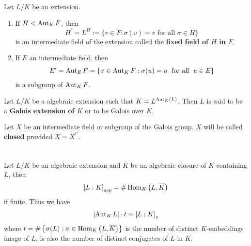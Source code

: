 \begin{definition}
    Let $L/K$ be an extension.
    \begin{enumerate}
        \item
              If $H< \operatorname{\operatorname{Aut}}_{ K } {F}$, then
              \begin{equation*}
                  H^\prime
                  =
                  L^H
                  :=
                  \{
                  {v} \in {F} :\sigma({v})={v} \text{ for all }\sigma \in H
                  \}
              \end{equation*}
              is an intermediate field of the extension called the \textbf{fixed field of $H$ in $F$}.

        \item
              If $E$ an intermediate field, then
              \begin{equation*}
                  E^\prime
                  =
                  \operatorname{\operatorname{Aut}}_{E} {F}
                  =
                  \left\{\sigma \in \operatorname{\operatorname{Aut}}_{ K } {F} : \sigma( u )= u \right. \text{ for all } \left. u  \in E\right\}
              \end{equation*}
              is a subgroup of $\operatorname{\operatorname{Aut}}_{ K } {F}$.
    \end{enumerate}
\end{definition}
\begin{definition}
    Let $L/K$ be a algebraic extension such that
    $K=L^{\operatorname{\operatorname{Aut}}_K(L)}$.
    Then $L$ is said to be a \textbf{Galois extension of $K$} or to be Galois over $K$.

    Let $X$ be an intermediate field or subgroup of the Galois group. $X$ will be called \textbf{closed} provided $X=X^{\prime \prime}$.
\end{definition}

\section{}
\begin{proposition}
    Let $L/K$ be an algebraic extension and $\overline{K}$ be an algebraic closure of $K$ containing $L$, then
    \begin{equation*}
        \left[L:K\right]_{sep}
        =
        \#\operatorname{\operatorname{Hom}}_{K}\left(L, \overline{K}\right)
    \end{equation*}
    if finite. Thus we have
    \begin{equation*}
        \left|\operatorname{\operatorname{Aut}}_{K} L\right| \cdot t
        =
        \left[L: K\right]_s
    \end{equation*}
    where $t=\#\left\{\sigma(L) : \sigma\in \operatorname{\operatorname{Hom}}_{K}\left(L, \overline{K}\right) \right\}$ is the number of distinct $K$-embeddings image of $L$, is also the number of distinct conjugates of $L$ in $\overline{K}$.
\end{proposition}


